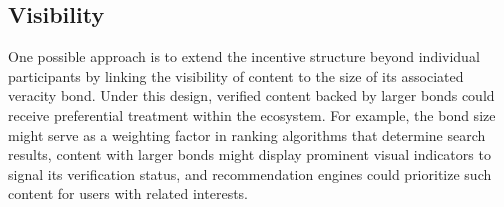 \documentclass{article}
\begin{document}




\subsection{Visibility}

One possible approach is to extend the incentive structure beyond individual participants by linking the visibility of content to the size of its associated veracity bond. Under this design, verified content backed by larger bonds could receive preferential treatment within the ecosystem. For example, the bond size might serve as a weighting factor in ranking algorithms that determine search results, content with larger bonds might display prominent visual indicators to signal its verification status, and recommendation engines could prioritize such content for users with related interests.
\end{document}
